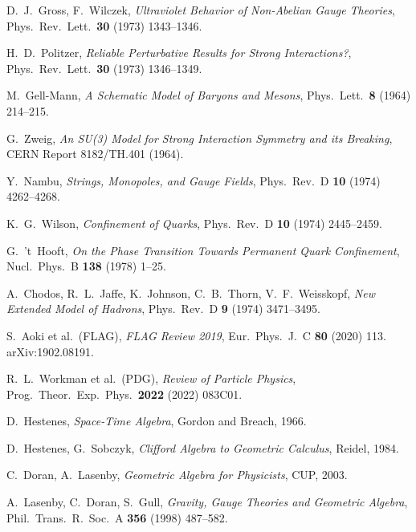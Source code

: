 \documentclass[11pt,a4paper]{article}
\theoremstyle{definition}
\theoremstyle{plain}
\theoremstyle{remark}
\begin{document}
\begin{thebibliography}{99}\setlength{\itemsep}{3pt}

D.~J.~Gross, F.~Wilczek, \emph{Ultraviolet Behavior of Non-Abelian Gauge Theories}, Phys.\ Rev.\ Lett.\ \textbf{30} (1973) 1343--1346.

H.~D.~Politzer, \emph{Reliable Perturbative Results for Strong Interactions?}, Phys.\ Rev.\ Lett.\ \textbf{30} (1973) 1346--1349.

M.~Gell-Mann, \emph{A Schematic Model of Baryons and Mesons}, Phys.\ Lett.\ \textbf{8} (1964) 214--215.

G.~Zweig, \emph{An SU(3) Model for Strong Interaction Symmetry and its Breaking}, CERN Report 8182/TH.401 (1964).

Y.~Nambu, \emph{Strings, Monopoles, and Gauge Fields}, Phys.\ Rev.\ D \textbf{10} (1974) 4262--4268.

K.~G.~Wilson, \emph{Confinement of Quarks}, Phys.\ Rev.\ D \textbf{10} (1974) 2445--2459.

G.~'t~Hooft, \emph{On the Phase Transition Towards Permanent Quark Confinement}, Nucl.\ Phys.\ B \textbf{138} (1978) 1--25.

A.~Chodos, R.~L.~Jaffe, K.~Johnson, C.~B.~Thorn, V.~F.~Weisskopf, \emph{New Extended Model of Hadrons}, Phys.\ Rev.\ D \textbf{9} (1974) 3471--3495.

S.~Aoki et al.\ (FLAG), \emph{FLAG Review 2019}, Eur.\ Phys.\ J.\ C \textbf{80} (2020) 113. arXiv:1902.08191.

R.~L.~Workman et al.\ (PDG), \emph{Review of Particle Physics}, Prog.\ Theor.\ Exp.\ Phys.\ \textbf{2022} (2022) 083C01.

D.~Hestenes, \emph{Space-Time Algebra}, Gordon and Breach, 1966.

D.~Hestenes, G.~Sobczyk, \emph{Clifford Algebra to Geometric Calculus}, Reidel, 1984.

C.~Doran, A.~Lasenby, \emph{Geometric Algebra for Physicists}, CUP, 2003.

A.~Lasenby, C.~Doran, S.~Gull, \emph{Gravity, Gauge Theories and Geometric Algebra}, Phil.\ Trans.\ R.\ Soc.\ A \textbf{356} (1998) 487--582.


\end{thebibliography}
\end{document}
